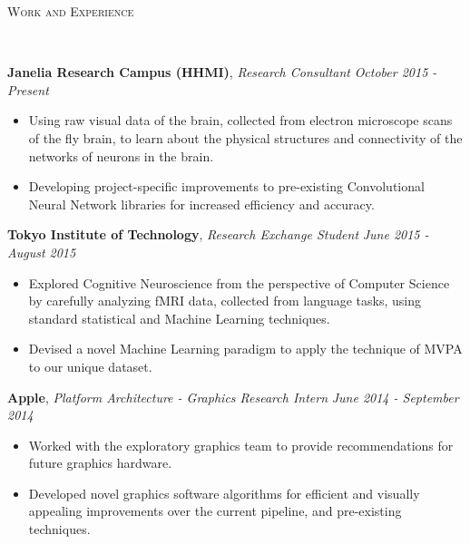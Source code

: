 \documentclass[9pt]{article}
\newenvironment{changemargin}[2]{%
  \begin{list}{}{%
    \setlength{\topsep}{0pt}%
    \setlength{\leftmargin}{#1}%
    \setlength{\rightmargin}{#2}%
    \setlength{\listparindent}{\parindent}%
    \setlength{\itemindent}{\parindent}%
    \setlength{\parsep}{\parskip}%
  }%
  \item[]}{\end{list}
}
\newcommand{\lineover}{
	\begin{changemargin}{-0.05in}{-0.05in}
		\vspace*{-8pt}
		\hrulefill \\
		\vspace*{-2pt}
	\end{changemargin}
}
\newcommand{\header}[1]{
	\begin{changemargin}{-0.5in}{-0.5in}
		\scshape{#1}\\
  	\lineover
	\end{changemargin}
}
\newenvironment{body} {
	\vspace*{-16pt}
	\begin{changemargin}{-0.25in}{-0.5in}
  }	
	{\end{changemargin}
}
\begin{document}
\smallskip
\vspace*{-3pt}

\header{Work and Experience}
\begin{body}
	\vspace{14pt}
	\textbf{Janelia Research Campus (HHMI)}, \emph{Research Consultant} \hfill \emph{October 2015 - Present}\\
	\vspace*{-3pt}
	\begin{itemize} \itemsep -0pt %
	\item Using raw visual data of the brain, collected from electron microscope scans of the fly brain, to learn about the physical structures and connectivity of the networks of neurons in the brain.
	\item Developing project-specific improvements to pre-existing Convolutional Neural Network libraries for increased efficiency and accuracy.
	\end{itemize}
	\vspace*{-2pt}
	\textbf{Tokyo Institute of Technology}, \emph{Research Exchange Student} \hfill \emph{June 2015 - August 2015}\\
	\vspace*{-3pt}
	\begin{itemize} \itemsep -0pt %
	\item Explored Cognitive Neuroscience from the perspective of Computer Science by carefully analyzing fMRI data, collected from language tasks, using standard statistical and Machine Learning techniques.
	\item Devised a novel Machine Learning paradigm to apply the technique of MVPA to our unique dataset.
	\end{itemize}
	\vspace*{-2pt}
	\textbf{Apple}, \emph{Platform Architecture - Graphics Research Intern} \hfill \emph{June 2014 - September 2014}\\
	\vspace*{-3pt}
	\begin{itemize} \itemsep -0pt %
	\item Worked with the exploratory graphics team to provide recommendations for future graphics hardware.
	\item Developed novel graphics software algorithms for efficient and visually appealing improvements over the current pipeline, and pre-existing techniques.

\end{itemize}
\end{body}
\end{document}
